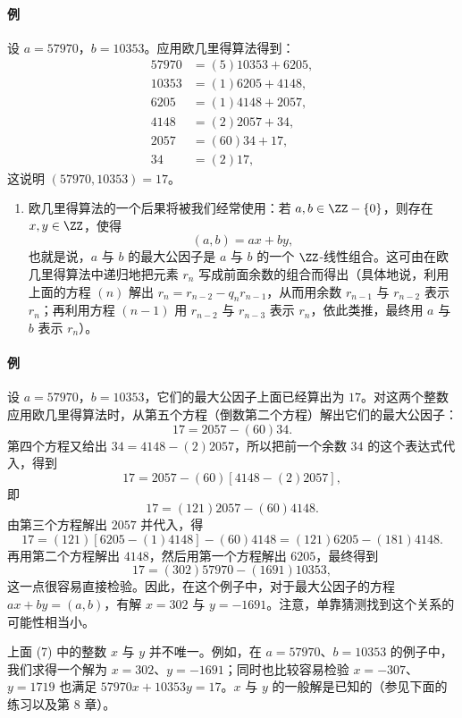 \paragraph{例}
设 $a=57970$，$b=10353$。应用欧几里得算法得到：
\begin{align*}
  57970&=(5)10353+6205,\\
  10353&=(1)6205+4148,\\
  6205&=(1)4148+2057,\\
  4148&=(2)2057+34,\\
  2057&=(60)34+17,\\
  34&=(2)17,
\end{align*}
这说明 $(57970,10353)=17$。

\begin{enumerate}[label=(\arabic*),resume]
  \item 欧几里得算法的一个后果将被我们经常使用：若 $a,b\in\ZZ-\{0\}$，则存在 $x,y\in\ZZ$，使得
  \[
    (a,b)=ax+by,
  \]
  也就是说，$a$ 与 $b$ 的最大公因子是 $a$ 与 $b$ 的一个 $\ZZ$-线性组合。这可由在欧几里得算法中递归地把元素 $r_n$ 写成前面余数的组合而得出（具体地说，利用上面的方程 $(n)$ 解出 $r_n=r_{n-2}-q_nr_{n-1}$，从而用余数 $r_{n-1}$ 与 $r_{n-2}$ 表示 $r_n$；再利用方程 $(n-1)$ 用 $r_{n-2}$ 与 $r_{n-3}$ 表示 $r_n$，依此类推，最终用 $a$ 与 $b$ 表示 $r_n$）。
\end{enumerate}

\paragraph{例}
设 $a=57970$，$b=10353$，它们的最大公因子上面已经算出为 $17$。对这两个整数应用欧几里得算法时，从第五个方程（倒数第二个方程）解出它们的最大公因子：
\[
  17=2057-(60)34.
\]
第四个方程又给出 $34=4148-(2)2057$，所以把前一个余数 $34$ 的这个表达式代入，得到
\[
  17=2057-(60)[4148-(2)2057],
\]
即
\[
  17=(121)2057-(60)4148.
\]
由第三个方程解出 $2057$ 并代入，得
\[
  17=(121)[6205-(1)4148]-(60)4148=(121)6205-(181)4148.
\]
再用第二个方程解出 $4148$，然后用第一个方程解出 $6205$，最终得到
\[
  17=(302)57970-(1691)10353,
\]
这一点很容易直接检验。因此，在这个例子中，对于最大公因子的方程 $ax+by=(a,b)$，有解 $x=302$ 与 $y=-1691$。注意，单靠猜测找到这个关系的可能性相当小。

上面 (7) 中的整数 $x$ 与 $y$ 并不唯一。例如，在 $a=57970$、$b=10353$ 的例子中，我们求得一个解为 $x=302$、$y=-1691$；同时也比较容易检验 $x=-307$、$y=1719$ 也满足 $57970x+10353y=17$。$x$ 与 $y$ 的一般解是已知的（参见下面的练习以及第 8 章）。

